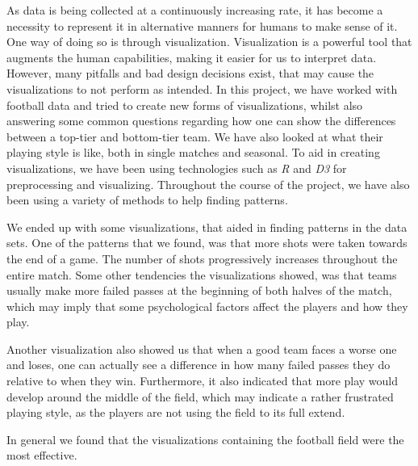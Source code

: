 \documentclass[Report.tex]{subfiles}
\begin{document}
 
As data is being collected at a continuously increasing rate, it has become a necessity to represent it in alternative manners for humans to make sense of it. One way of doing so is through visualization. Visualization is a powerful tool that augments the human capabilities, making it easier for us to interpret data. However, many pitfalls and bad design decisions exist, that may cause the visualizations to not perform as intended. In this project, we have worked with football data and tried to create new forms of visualizations, whilst also answering some common questions regarding how one can show the differences between a top-tier and bottom-tier team. We have also looked at what their playing style is like, both in single matches and seasonal. To aid in creating visualizations, we have been using technologies such as \emph{R} and \emph{D3} for preprocessing and visualizing. Throughout the course of the project, we have also been using a variety of methods to help finding patterns. 

We ended up with some visualizations, that aided in finding patterns in the data sets. One of the patterns that we found, was that more shots were taken towards the end of a game. The number of shots progressively increases throughout the entire match. Some other tendencies the visualizations showed, was that teams usually make more failed passes at the beginning of both halves of the match, which may imply that some psychological factors affect the players and how they play. 

Another visualization also showed us that when a good team faces a worse one and loses, one can actually see a difference in how many failed passes they do relative to when they win. Furthermore, it also indicated that more play would develop around the middle of the field, which may indicate a rather frustrated playing style, as the players are not using the field to its full extend. 

In general we found that the visualizations containing the football field were the most effective. 
\end{document}
